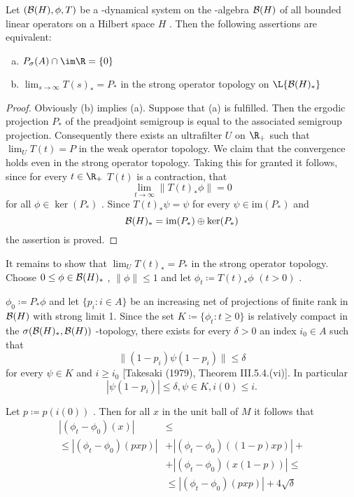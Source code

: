 \begin{proposition}\label{prop:d4-3.7}
Let $ (\mathcal{B}(H),\phi,T) $  be a \WA-dynamical system on the \WA-algebra $ \mathcal{B}(H) $  of all bounded linear operators on a Hilbert space $ H $ .
Then the following assertions are equivalent:
\begin{enumerate}[(a)]
\item
$ P_{\sigma}(A) \cap \im\R = \{0\} $ 

\item
$ \lim_{s \to \infty} T(s)_{*} = P_{*} $  in the strong operator topology on $ \L{\BH_{*}} $ 
\end{enumerate}
\end{proposition}

\begin{proof}
Obviously (b) implies (a).
Suppose that (a) is fulfilled.
Then the ergodic projection $ P_{*} $  of the preadjoint semigroup is equal to the associated semigroup projection.
Consequently there exists an ultrafilter $ U $  on $ \R_{+} $  such that $ \lim_{U} T(t) = P $  in the weak operator topology.
We claim that the convergence holds even in the strong operator topology.
Taking this for granted it follows, since for every $ t \in \R_{+} $  $ T(t) $  is a contraction, that
\[
\lim_{t \to \infty} \|T(t)_{*}\phi\| = 0
\]
for all $ \phi \in \ker(P_{*}) $ .
Since $ T(t)_{*}\psi = \psi $  for every $ \psi \in \text{im}(P_{*}) $  and
\[
\mathcal{B}(H)_{*} = \text{im}(P_{*}) \oplus \ker(P_{*})
\]
the assertion is proved.
\end{proof}


It remains to show that $ \lim_{U} T(t)_{*} = P_{*} $  in the strong operator topology.
Choose $ 0 \leq \phi \in \mathcal{B}(H)_{*} $ , $ \|\phi\| \leq 1 $  and let $ \phi_{t} \coloneqq T(t)_{*}\phi $  $ (t>0) $ .

\newpage

$ \phi_{0} \coloneqq P_{*}\phi $  and let $ \{p_{i}: i \in A\} $  be an increasing net of projections of finite rank in $ \mathcal{B}(H) $  with strong limit 1.
Since the set $ K \coloneqq \{\phi_{t}: t \geq 0\} $  is relatively compact in the $ \sigma(\mathcal{B}(H)_{*},\mathcal{B}(H)) $ -topology, there exists for every $ \delta > 0 $  an index $ i_{0} \in A $  such that
\[
\|(1 - p_{i})\psi(1 - p_{i})\| \leq \delta
\]
for every $ \psi \in K $  and $ i \geq i_{0} $  [Takesaki (1979), Theorem III.5.4.(vi)].
In particular
\[
|\psi(1 - p_{i})| \leq \delta, \psi \in K, i(0) \leq i.
\]

Let $ p \coloneqq p(i(0)) $ .
Then for all $ x $  in the unit ball of $ M $  it follows that
\begin{align*}
|(\phi_{t} - \phi_{0})(x)| &\leq \\
\leq |(\phi_{t} - \phi_{0})(pxp)| &+ |(\phi_{t} - \phi_{0})((1-p)xp)| + \\
&+ |(\phi_{t} - \phi_{0})(x(1-p))| \leq \\
&\leq |(\phi_{t} - \phi_{0})(pxp)| + 4\sqrt{\delta} 
\end{align*}

